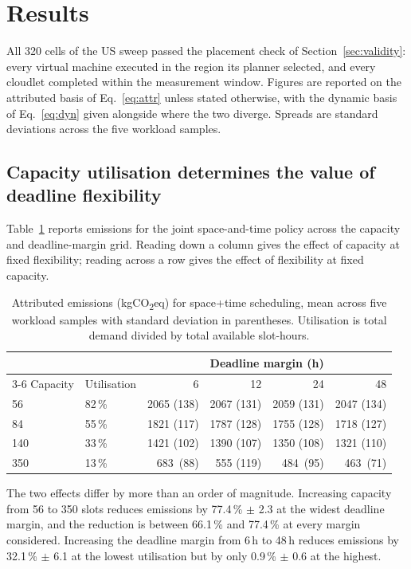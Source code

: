 \section{Results}
\label{sec:results}

All 320 cells of the US sweep passed the placement check of
Section~\ref{sec:validity}: every virtual machine executed in the region its
planner selected, and every cloudlet completed within the measurement window.
Figures are reported on the attributed basis of Eq.~\eqref{eq:attr} unless
stated otherwise, with the dynamic basis of Eq.~\eqref{eq:dyn} given alongside
where the two diverge. Spreads are standard deviations across the five workload
samples.

\subsection{Capacity utilisation determines the value of deadline flexibility}
\label{sec:res-capacity}

Table~\ref{tab:capmargin} reports emissions for the joint space-and-time policy
across the capacity and deadline-margin grid. Reading down a column gives the
effect of capacity at fixed flexibility; reading across a row gives the effect
of flexibility at fixed capacity.

\begin{table}[t]
\centering
\caption{Attributed emissions (kgCO\textsubscript{2}eq) for space+time
scheduling, mean across five workload samples with standard deviation in
parentheses. Utilisation is total demand divided by total available slot-hours.}
\label{tab:capmargin}
\begin{tabular}{llrrrr}
\toprule
& & \multicolumn{4}{c}{Deadline margin (h)} \\
\cmidrule(l){3-6}
Capacity & Utilisation & 6 & 12 & 24 & 48 \\
\midrule
 56 & 82\,\% & 2065 (138) & 2067 (131) & 2059 (131) & 2047 (134) \\
 84 & 55\,\% & 1821 (117) & 1787 (128) & 1755 (128) & 1718 (127) \\
140 & 33\,\% & 1421 (102) & 1390 (107) & 1350 (108) & 1321 (110) \\
350 & 13\,\% &  683\ (88) &  555 (119) &  484\ (95) &  463\ (71) \\
\bottomrule
\end{tabular}
\end{table}

The two effects differ by more than an order of magnitude. Increasing capacity
from 56 to 350 slots reduces emissions by 77.4\,\% $\pm$ 2.3 at the widest
deadline margin, and the reduction is between 66.1\,\% and 77.4\,\% at every
margin considered. Increasing the deadline margin from 6\,h to 48\,h reduces
emissions by 32.1\,\% $\pm$ 6.1 at the lowest utilisation but by only
0.9\,\% $\pm$ 0.6 at the highest.

